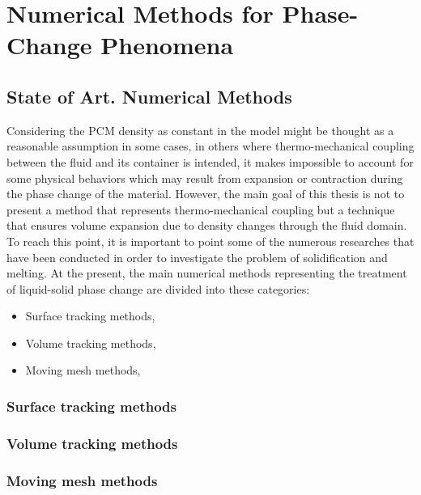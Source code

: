 
\chapter{Numerical Methods for Phase-Change Phenomena} %

\label{Chapter2} %


\section{State of Art. Numerical Methods} %
Considering the PCM density as constant in the model might be thought as a reasonable assumption in some cases, in others where thermo-mechanical coupling between the fluid and its container is intended, it makes impossible to account for some physical behaviors which may result from expansion or contraction during the phase change of the material. However, the main goal of this thesis is not to present a method that represents thermo-mechanical coupling but a technique that ensures volume expansion due to density changes through the fluid domain.
To reach this point, it is important to point some of the numerous researches that have been conducted in order to investigate the problem of solidification and melting. 
At the present, the main numerical methods representing the treatment of liquid-solid phase change are divided into these categories:
\begin{itemize}
	\item Surface tracking methods,
	\item Volume tracking methods,
	\item Moving mesh methods,
\end{itemize}
\subsection*{Surface tracking methods}

\subsection*{Volume tracking methods}

\subsection*{Moving mesh methods}

